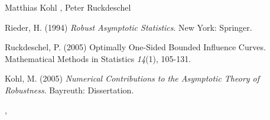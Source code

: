 \begin{Author}\relax
Matthias Kohl ,
Peter Ruckdeschel 
\end{Author}
\begin{References}\relax
Rieder, H. (1994) \emph{Robust Asymptotic Statistics}. New York: Springer.

Ruckdeschel, P. (2005) Optimally One-Sided Bounded Influence Curves.
Mathematical Methods in Statistics \emph{14}(1), 105-131.

Kohl, M. (2005) \emph{Numerical Contributions to the Asymptotic Theory of Robustness}. 
Bayreuth: Dissertation.
\end{References}
\begin{SeeAlso}\relax
{}, 
\end{SeeAlso}

